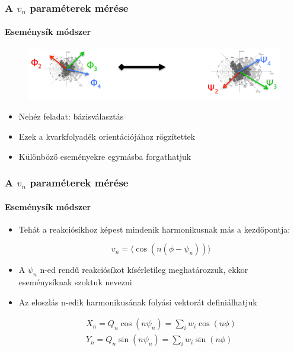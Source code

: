 \documentclass{beamer}
\begin{document}
\begin{frame}
\frametitle{A $v_n$ paraméterek mérése}
\framesubtitle{Eseménysík módszer}
\begin{center}
\begin{figure}
\includegraphics[scale=0.3]{pic/rp}
\end{figure}
\end{center}
\begin{itemize}
\item Nehéz feladat: bázisválasztás
\item Ezek a kvarkfolyadék orientációjához rögzítettek
\item Különböző eseményekre egymásba forgathatjuk
\end{itemize}
\end{frame}

\begin{frame}
\frametitle{A $v_n$ paraméterek mérése}
\framesubtitle{Eseménysík módszer}
\begin{itemize}
\item Tehát a reakciósíkhoz képest mindenik harmonikusnak más a kezdőpontja:
\begin{center}
\begin{equation}
v_n = \langle\cos(n(\phi-\psi_n))\rangle
\end{equation}
\end{center}
\item A $\psi_n$ n-ed rendű reakciósíkot kísérletileg meghatározzuk, ekkor eseménysíknak szoktuk nevezni
\item Az eloszlás n-edik harmonikusának folyási vektorát definiálhatjuk
\begin{center}
\begin{align}
X_n=Q_n \cos(n\psi_n)=\sum_{i}w_i\cos(n\phi) \\
Y_n=Q_n \sin(n\psi_n)=\sum_{i}w_i\sin(n\phi)
\end{align}
\end{center}
\end{itemize}
\end{frame}
\end{document}
